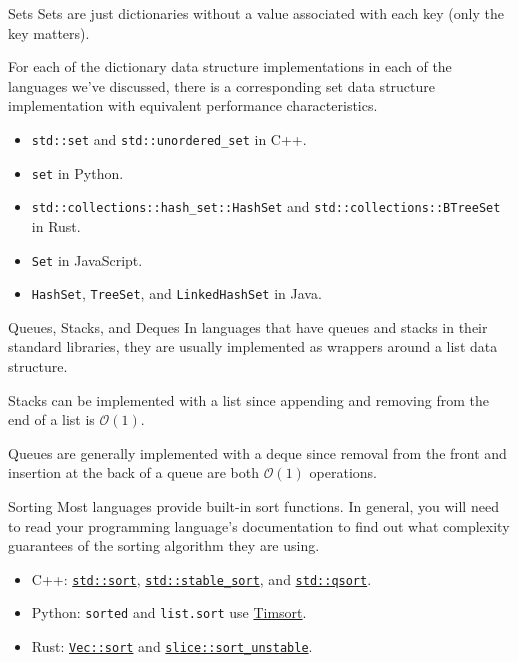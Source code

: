 \documentclass{algo}
\begin{document}
\begin{frame}{Sets}
    Sets are just dictionaries without a value associated with each key (only
    the key matters).

    For each of the dictionary data structure implementations in each of the
    languages we've discussed, there is a corresponding set data structure
    implementation with equivalent performance characteristics.
    \pause

    \begin{itemize}
        \item \texttt{std::set} and \texttt{std::unordered\_set} in C++.
        \item \texttt{set} in Python.
        \item \texttt{std::collections::hash\_set::HashSet} and
            \texttt{std::collections::BTreeSet} in Rust.
        \item \texttt{Set} in JavaScript.
        \item \texttt{HashSet}, \texttt{TreeSet}, and \texttt{LinkedHashSet} in
            Java.
    \end{itemize}
\end{frame}

\begin{frame}{Queues, Stacks, and Deques}
    In languages that have queues and stacks in their standard libraries, they
    are usually implemented as wrappers around a list data structure.
    \pause

    Stacks can be implemented with a list since appending and removing from the
    end of a list is $\mathcal{O}(1)$.
    \pause

    Queues are generally implemented with a deque since removal from the front
    and insertion at the back of a queue are both $\mathcal{O}(1)$ operations.
\end{frame}

\begin{frame}{Sorting}
    Most languages provide built-in sort functions. In general, you will need to
    read your programming language's documentation to find out what complexity
    guarantees of the sorting algorithm they are using.

    \begin{itemize}
        \item C++:
            \href{https://en.cppreference.com/w/cpp/algorithm/sort}{\texttt{std::sort}},
            \href{https://en.cppreference.com/w/cpp/algorithm/stable_sort}{\texttt{std::stable\_sort}},
            and
            \href{https://en.cppreference.com/w/cpp/algorithm/qsort}{\texttt{std::qsort}}.

        \item Python: \texttt{sorted} and \texttt{list.sort} use
            \href{https://en.wikipedia.org/wiki/Timsort}{Timsort}.

        \item Rust:
            \href{https://doc.rust-lang.org/std/vec/struct.Vec.html\#method.sort}{\texttt{Vec::sort}}
            and
            \href{https://doc.rust-lang.org/std/primitive.slice.html\#method.sort_unstable}{\texttt{slice::sort\_unstable}}.
    \end{itemize}
\end{frame}
\end{document}
